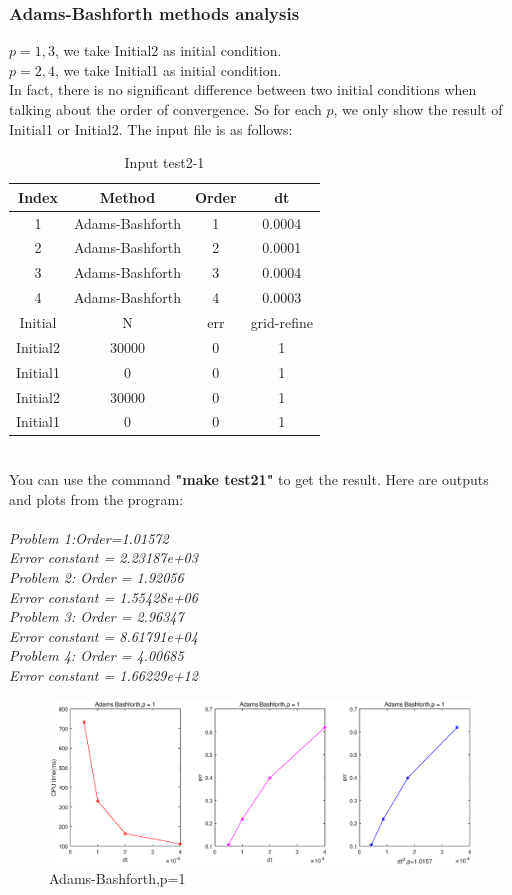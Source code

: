 \documentclass[a4paper,twocolumn]{article}
\theoremstyle{definition}
\begin{document}
\subsubsection{Adams-Bashforth methods analysis}
$p = 1,3$, we take Initial2 as initial condition.\\
$p = 2,4$, we take Initial1 as initial condition.\\
In fact, there is no significant difference between two initial conditions when talking about the order of convergence. So for each $p$, we only show the result of Initial1 or Initial2. The input file is as follows:
\begin{table}[!htp]
	\centering
	\begin{tabular}{|c|c|c|c|}
		\hline	
		Index & Method & Order & dt \\
		\hline		
		1 & Adams-Bashforth & 1 & 0.0004   \\	
		\hline		
		2 & Adams-Bashforth & 2 & 0.0001   \\
		\hline		
		3 & Adams-Bashforth & 3 & 0.0004   \\	
		\hline		
		4 & Adams-Bashforth & 4 & 0.0003   \\	
		\hline \hline
		Initial & N & err & grid-refine \\
		\hline
		Initial2 & 30000 & 0 & 1 \\
		\hline
		Initial1 & 0 & 0 & 1 \\
		\hline
		Initial2 & 30000 & 0 & 1 \\
		\hline
		Initial1 & 0 & 0 & 1 \\
		\hline
	\end{tabular}
	\caption{Input test2-1}
	\label{tab:test21}
\end{table}\\
You can use the command \textbf{"make test21"} to get the result. Here are outputs and plots from the program:\\\\
\emph{Problem 1:Order=1.01572}\\
\emph{Error constant = 2.23187e+03}\\
\emph{Problem 2: Order = 1.92056}\\
\emph{Error constant = 1.55428e+06}\\
\emph{Problem 3: Order = 2.96347}\\
\emph{Error constant = 8.61791e+04}\\
\emph{Problem 4: Order = 4.00685}\\
\emph{Error constant = 1.66229e+12}
\onecolumn
\begin{figure}[!htp]   
	\centering
	\includegraphics[width=12cm]{Pictures/2_1_1.eps}
	\caption{Adams-Bashforth,p=1}
	\label{fig:AB1gf}
\end{figure}
\end{document}

